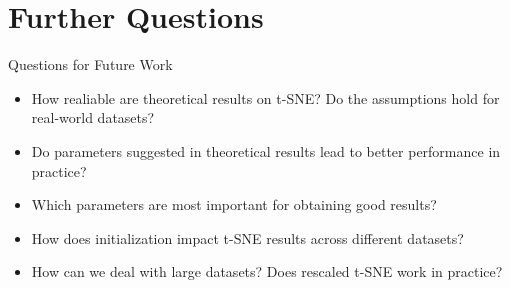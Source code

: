 \section{Further Questions}

\begin{frame}{Questions for Future Work}
    \begin{itemize}
        \item How realiable are theoretical results on t-SNE? Do the assumptions hold for real-world datasets? \pause
        \item Do parameters suggested in theoretical results lead to better performance in practice? \pause
        \item Which parameters are most important for obtaining good results? \pause
        \item How does initialization impact t-SNE results across different datasets? \pause
        \item How can we deal with large datasets? Does rescaled t-SNE work in practice? 
    \end{itemize}
\end{frame}